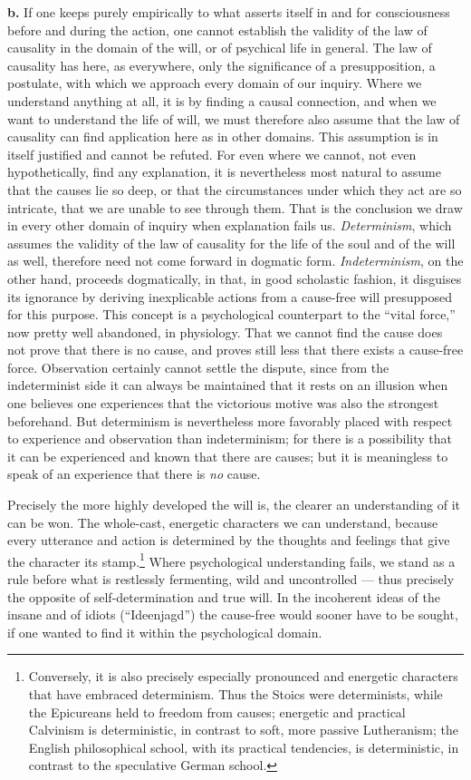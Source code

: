 \documentclass[12pt,a4paper]{book}
\newcommand{\opage}[1]{\marginnote{\footnotesize\textit{[#1]}}}
\begin{document}
\opage{400}\textbf{b.} If one keeps purely empirically to what asserts
itself in and for consciousness before and during the action, one cannot
establish the validity of the law of causality in the domain of the will,
or of psychical life in general. The law of causality has here, as
everywhere, only the significance of a presupposition, a postulate, with
which we approach every domain of our inquiry. Where we understand
anything at all, it is by finding a causal connection, and when we want to
understand the life of will, we must therefore also assume that the law
of causality can find application here as in other domains. This
assumption is in itself justified and cannot be refuted. For even where we
cannot, not even hypothetically, find any explanation, it is nevertheless
most natural to assume that the causes lie so deep, or that the
circumstances under which they act are so intricate, that we are unable
to see through them. That is the conclusion we draw in every other domain
of inquiry when explanation fails us. \emph{Determinism}, which assumes the
validity of the law of causality for the life of the soul and of the will
as well, therefore need not come forward in dogmatic form.
\emph{Indeterminism}, on the other hand, proceeds dogmatically, in that, in
good scholastic fashion, it disguises its ignorance by deriving
inexplicable actions from a cause-free will presupposed for this purpose.
This concept is a psychological counterpart to the ``vital force,'' now
pretty well abandoned, in physiology. That we cannot find the cause does
not prove that there is no cause, and proves still less that there exists
a cause-free force. Observation certainly cannot settle the dispute, since
from the indeterminist side it can always be maintained that it rests on
an illusion when one believes one experiences that the victorious motive
was also the strongest beforehand. But determinism is nevertheless more
favorably placed with respect to experience and observation than
indeterminism; for there is a possibility that it can be experienced and
known that there are causes; but it is meaningless to speak of an
experience that there is \emph{no} cause.

Precisely the more highly developed the will is, the clearer an
understanding of it can be won. The whole-cast, energetic characters we
can understand, because every utterance and action is determined by the
thoughts and feelings that give the character
\opage{401}its stamp.\footnote{Conversely, it is also precisely
especially pronounced and energetic characters that have embraced
determinism. Thus the Stoics were determinists, while the Epicureans held
to freedom from causes; energetic and practical Calvinism is
deterministic, in contrast to soft, more passive Lutheranism; the English
philosophical school, with its practical tendencies, is deterministic, in
contrast to the speculative German school.} Where psychological
understanding fails, we stand as a rule before what is restlessly
fermenting, wild and uncontrolled --- thus precisely the opposite of
self-determination and true will. In the incoherent ideas of the insane
and of idiots (``Ideenjagd'') the cause-free would sooner have to be
sought, if one wanted to find it within the psychological domain.
\end{document}
